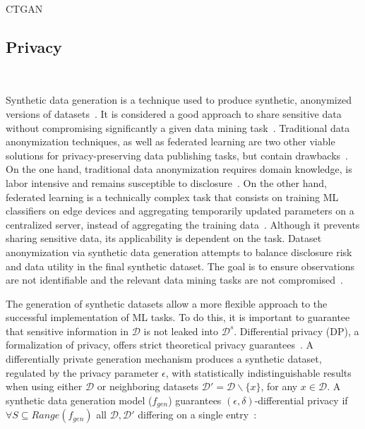 \documentclass[parskip=full]{scrartcl}
\begin{document}
CTGAN~\cite{xu2019modeling}

\subsection{Privacy}~\label{sec:data-privacy}

Synthetic data generation is a technique used to produce synthetic, anonymized
versions of datasets~\cite{dankar2021fake}. It is considered a good approach
to share sensitive data without compromising significantly a given data mining
task~\cite{taub2018differential, park2018data}. Traditional data anonymization
techniques, as well as federated learning are two other viable solutions for
privacy-preserving data publishing tasks, but contain
drawbacks~\cite{hernandez2022synthetic}. On the one hand, traditional data
anonymization requires domain knowledge, is labor intensive and remains
susceptible to disclosure~\cite{reiter2004new}. On the other hand, federated
learning is a technically complex task that consists on training ML
classifiers on edge devices and aggregating temporarily updated parameters on
a centralized server, instead of aggregating the training
data~\cite{yu2022survey}. Although it prevents sharing sensitive data, its
applicability is dependent on the task. Dataset anonymization via synthetic
data generation attempts to balance disclosure risk and data utility in the
final synthetic dataset. The goal is to ensure observations are not
identifiable and the relevant data mining tasks are not
compromised~\cite{singh2017aggregating, li2018privacy}.

The generation of synthetic datasets allow a more flexible approach to the
successful implementation of ML tasks. To do this, it is important to
guarantee that sensitive information in $\mathcal{D}$ is not leaked into
$\mathcal{D}^s$. Differential privacy (DP), a formalization of privacy, offers
strict theoretical privacy guarantees~\cite{rosenblatt2020differentially}. A
differentially private generation mechanism produces a synthetic dataset,
regulated by the privacy parameter $\epsilon$, with statistically
indistinguishable results when using either $\mathcal{D}$ or neighboring
datasets $\mathcal{D}' = \mathcal{D} \backslash \{x\}$, for any $x \in
\mathcal{D}$. A synthetic data generation model ($f_{gen}$) guarantees
$(\epsilon, \delta)$-differential privacy if $\forall S \subseteq
Range(f_{gen})$ all $\mathcal{D}, \mathcal{D}'$ differing on a single
entry~\cite{hardt2012simple}:
\end{document}
